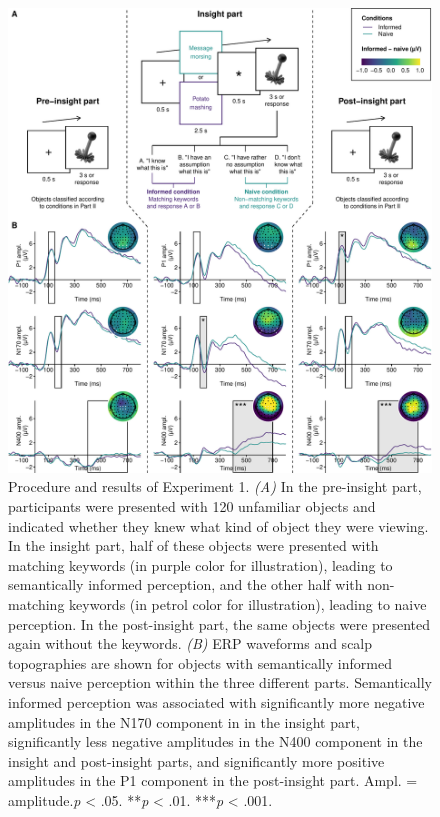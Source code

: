 \documentclass[
  english,
  doc,12pt,twoside,floatsintext]{apa7}
\begin{document}
\begin{figure}

{\centering \includegraphics[width=1\linewidth]{master_thesis_files/figure-latex/exp1-plot-1} 

}

\caption{Procedure and results of Experiment 1. \emph{(A)} In the pre-insight part, participants were presented with 120 unfamiliar objects and indicated whether they knew what kind of object they were viewing. In the insight part, half of these objects were presented with matching keywords (in purple color for illustration), leading to semantically informed perception, and the other half with non-matching keywords (in petrol color for illustration), leading to naive perception. In the post-insight part, the same objects were presented again without the keywords. \emph{(B)} ERP waveforms and scalp topographies are shown for objects with semantically informed versus naive perception within the three different parts. Semantically informed perception was associated with significantly more negative amplitudes in the N170 component in in the insight part, significantly less negative amplitudes in the N400 component in the insight and post-insight parts, and significantly more positive amplitudes in the P1 component in the post-insight part. Ampl. = amplitude.\newline*\emph{p} \textless{} .05. **\emph{p} \textless{} .01. ***\emph{p} \textless{} .001.}\label{fig:exp1-plot}
\end{figure}
\end{document}
